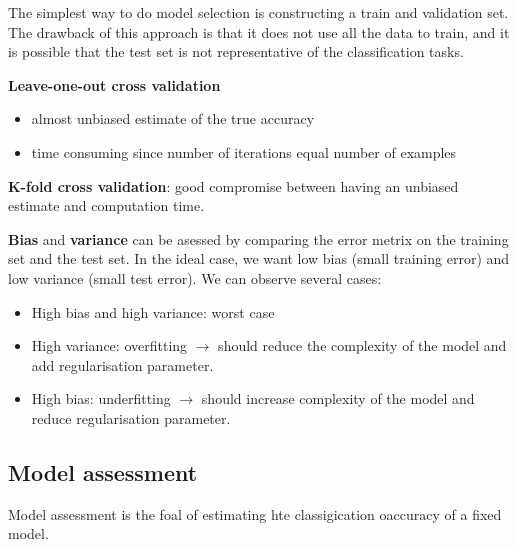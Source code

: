 The simplest way to do model selection is constructing a train and validation set. The drawback of this approach is that it does not use all the data to train, and it is possible that the test set is not representative of the classification tasks.

\textbf{Leave-one-out cross validation}
\begin{itemize}
	\item almost unbiased estimate of the true accuracy
	\item time consuming since number of iterations equal number of examples
\end{itemize}

\textbf{K-fold cross validation}: good compromise between having an unbiased estimate and computation time.

\textbf{Bias} and \textbf{variance} can be asessed by comparing the error metrix on the training set and the test set. In the ideal case, we want low bias (small training error) and low variance (small test error). We can observe several cases:
\begin{itemize}
	\item High bias and high variance: worst case
	\item High variance: overfitting $\rightarrow$ should reduce the complexity of the model and add regularisation parameter.
	\item High bias: underfitting $\rightarrow$ should increase complexity of the model and reduce regularisation parameter.
\end{itemize}

\subsection{Model assessment}
Model assessment is the foal of estimating hte classigication oaccuracy of a fixed model.

\afterpage{\null\newpage}
